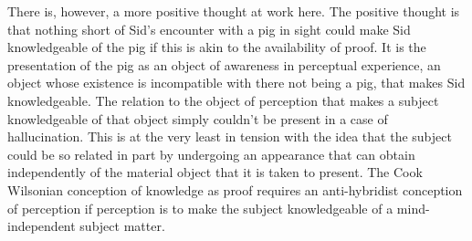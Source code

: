 There is, however, a more positive thought at work here. The positive thought is that nothing short of Sid's encounter with a pig in sight could make Sid knowledgeable of the pig if this is akin to the availability of proof. It is the presentation of the pig as an object of awareness in perceptual experience, an object whose existence is incompatible with there not being a pig, that makes Sid knowledgeable. The relation to the object of perception that makes a subject knowledgeable of that object simply couldn't be present in a case of hallucination. This is at the very least in tension with the idea that the subject could be so related in part by undergoing an appearance that can obtain independently of the material object that it is taken to present. The Cook Wilsonian conception of knowledge as proof requires an anti-hybridist conception of perception if perception is to make the subject knowledgeable of a mind-independent subject matter. 

